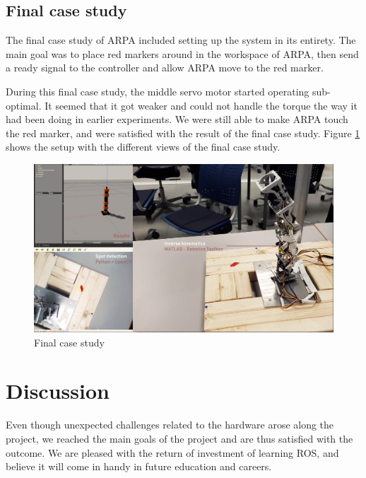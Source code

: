 \documentclass[11pt,a4paper, titlepage]{article}
\begin{document}
	
	\subsection{Final case study}
	The final case study of ARPA included setting up the system in its entirety. The main goal was to place red markers around in the workspace of ARPA, then send a ready signal to the controller and allow ARPA move to the red marker.
	
During this final case study, the middle servo motor started operating sub-optimal. It seemed that it got weaker and could not handle the torque the way it had been doing in earlier experiments. We were still able to make ARPA touch the red marker, and were satisfied with the result of the final case study. Figure \ref{fig:three-split} shows the setup with the different views of the final case study.
	\begin{figure}[H]
		\centering
		\includegraphics[width=\linewidth]{../Diagrams/ThreeSplit.png}
		\caption{Final case study}
		\label{fig:three-split}
	\end{figure}
	
	\section{Discussion}
	\label{discussion}
	Even though unexpected challenges related to the hardware arose along the project, we reached the main goals of the project and are thus satisfied with the outcome. We are pleased with the return of investment of learning ROS, and believe it will come in handy in future education and careers.
	
	
	
	\newpage
\end{document}
